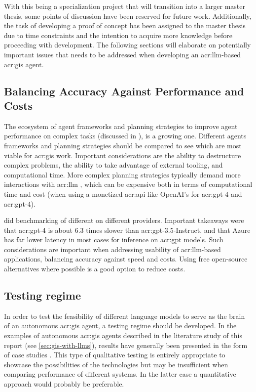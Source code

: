 With this being a specialization project that will transition into a larger master thesis, some points of discussion have been reserved for future work. Additionally, the task of developing a proof of concept has been assigned to the master thesis due to time constraints and the intention to acquire more knowledge before proceeding with development. The following sections will elaborate on potentially important issues that needs to be addressed when developing an \acrshort{acr:llm}-based \acrshort{acr:gis} agent.

\subsection{Balancing Accuracy Against Performance and Costs}

The ecosystem of agent frameworks and planning strategies to improve agent performance on complex tasks (discussed in ), is a growing one. Different agents frameworks and planning strategies should be compared to see which are most viable for \acrshort{acr:gis} work. Important considerations are the ability to destructure complex problems, the ability to take advantage of external tooling, and computational time. More complex planning strategies typically demand more interactions with \acrshort{acr:llm} , which can be expensive both in terms of computational time and cost (when using a monetized \acrshort{acr:api} like OpenAI's for \acrshort{acr:gpt}-4 and \acrshort{acr:gpt}-4).

\cite{clearyLatencyBenchmarksComparisons2023} did benchmarking of different  on different providers. Important takeaways were that \acrshort{acr:gpt}-4 is about 6.3 times slower than \acrshort{acr:gpt}-3.5-Instruct, and that Azure has far lower latency in most cases for inference on \acrshort{acr:gpt} models. Such considerations are important when addressing usability of \acrshort{acr:llm}-based applications, balancing accuracy against speed and costs. Using free open-source alternatives where possible is a good option to reduce costs.

\subsection{Testing regime}

In order to test the feasibility of different language models to serve as the brain of an autonomous \acrshort{acr:gis} agent, a testing regime should be developed. In the examples of autonomous \acrshort{acr:gis} agents described in the literature study of this report (see \autoref{sec:gis-with-llms}), results have generally been presented in the form of case studies \citep{liAutonomousGISNextgeneration2023,zhangGeoGPTUnderstandingProcessing2023}. This type of qualitative testing is entirely appropriate to showcase the possibilities of the technologies but may be insufficient when comparing performance of different systems. In the latter case a quantitative approach would probably be preferable.

